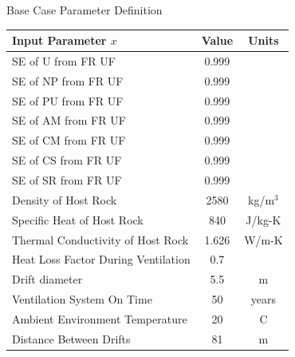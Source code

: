 \documentclass[pdf, autumn, slideColor, nocolorBG]{prosper}
\newcommand{\superscript}[1]{\ensuremath{^{\textrm{#1}}}}
\begin{document}
\begin{slide}{Base Case Parameter Definition}
\tiny
\begin{center}
\begin{tabular}{|l||c|c|}
\hline
\textbf{Input Parameter $x$} & \textbf{Value} & \textbf{Units} \\
\hline
SE of U from FR UF & 0.999 & \\
\hline
SE of NP from FR UF & 0.999 & \\
\hline
SE of PU from FR UF & 0.999 & \\
\hline
SE of AM from FR UF & 0.999 & \\
\hline
SE of CM from FR UF & 0.999 & \\
\hline
SE of CS from FR UF & 0.999 & \\
\hline
SE of SR from FR UF & 0.999 & \\
\hline
Density of Host Rock & 2580 & kg/m\superscript{3} \\
\hline
Specific Heat of Host Rock & 840 & J/kg-K \\
\hline
Thermal Conductivity of Host Rock & 1.626 & W/m-K \\
\hline
Heat Loss Factor During Ventilation  & 0.7 & \\
\hline
Drift diameter & 5.5 & m \\
\hline
Ventilation System On Time & 50 & years \\
\hline
Ambient Environment Temperature & 20 & C \\
\hline
Distance Between Drifts & 81 & m \\
\hline
\end{tabular}
\end{center}
\end{slide}
\end{document}
